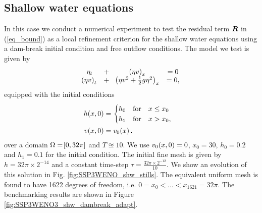 \documentclass[final]{amsart}
\renewcommand{\vect}[1]{\geovec{#1}}
\numberwithin{equation}{section}
\begin{document}
\subsection{Shallow water equations}\label{subsec:shallow_water_tests}
In this case we conduct a numerical experiment to test the residual term $\vect{R}$ in (\ref{eq_bound}) as a local refinement criterion for the shallow water equations using a dam-break initial condition and free outflow conditions.  The model we test is given by
\begin{equation}\label{eq_model_SWE}
\begin{aligned}
\begin{array}{c}
\eta_t\\
\!\left({\eta v}\right)_t
\end{array}
\begin{array}{c}
+\\
+
\end{array}
\begin{array}{c}
\!\left({\eta v}\right)_x\\
\!\left({\eta v^2+\frac{1}{2}g\eta^2}\right)_x
\end{array}
\begin{array}{c}
=0\\
=0,
\end{array}
\end{aligned}
\end{equation}
equipped with the initial conditions
\begin{equation}
\begin{aligned}
h\!\left({x,0}\right)&=\begin{cases}
h_0\quad \text{for} \quad x\leq x_0\\
h_1\quad \text{for}\quad  x> x_0,
\end{cases}\\
v\!\left({x,0}\right)&=v_0\!\left({x}\right).
\end{aligned}
\end{equation}
over a domain $\Omega=\!\left[{0, 32\pi}\right]$ and $T\approxeq10$. We use
$v_0\!\left({x,0}\right) = 0$, $x_0 = 30$, $h_0=0.2$ and $h_1= 0.1$ for the
initial condition.  The initial fine mesh is given by $h=32\pi \times
2^{-14}$ and a constant time-step $\tau =\frac{32\pi \times 2^{-12}
}{10}$. We show an evolution of this solution in Fig. \ref{fig:SSP3WENO_shw_stills}. The equivalent uniform mesh is found to have 1622 degrees of freedom, i.e. $0=x_0<\dots<x_{1621}=32\pi$.  The benchmarking results are shown in Figure \ref{fig:SSP3WENO3_shw_dambreak_adapt}.
\end{document}
